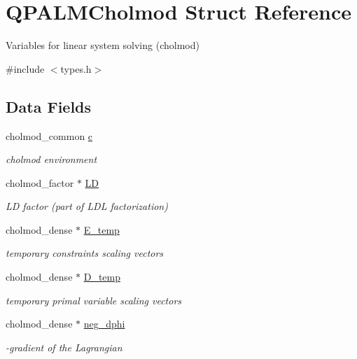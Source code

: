 \hypertarget{structQPALMCholmod}{}\section{Q\+P\+A\+L\+M\+Cholmod Struct Reference}
\label{structQPALMCholmod}


Variables for linear system solving (cholmod)  




{\ttfamily \#include $<$types.\+h$>$}

\subsection*{Data Fields}
\begin{DoxyCompactItemize}
\item 
cholmod\+\_\+common \mbox{\hyperlink{structQPALMCholmod_ae0b17902eab7e85f15ec7bcbcc555a89}{c}}
\begin{DoxyCompactList}\small\item\em cholmod environment \end{DoxyCompactList}\item 
cholmod\+\_\+factor $\ast$ \mbox{\hyperlink{structQPALMCholmod_aa13c04a0c6d42ce03f4ed35facecdb17}{LD}}
\begin{DoxyCompactList}\small\item\em LD factor (part of L\+DL\textquotesingle{} factorization) \end{DoxyCompactList}\item 
cholmod\+\_\+dense $\ast$ \mbox{\hyperlink{structQPALMCholmod_a81f1783209b107329ef325f7da73c231}{E\+\_\+temp}}
\begin{DoxyCompactList}\small\item\em temporary constraints scaling vectors \end{DoxyCompactList}\item 
cholmod\+\_\+dense $\ast$ \mbox{\hyperlink{structQPALMCholmod_a75e770d10fb08d241acdd13373288e70}{D\+\_\+temp}}
\begin{DoxyCompactList}\small\item\em temporary primal variable scaling vectors \end{DoxyCompactList}\item 
cholmod\+\_\+dense $\ast$ \mbox{\hyperlink{structQPALMCholmod_a7c0275f19a37eb6108f98c867c2c843f}{neg\+\_\+dphi}}
\begin{DoxyCompactList}\small\item\em -\/gradient of the Lagrangian \end{DoxyCompactList}\item 

\end{DoxyCompactItemize}

